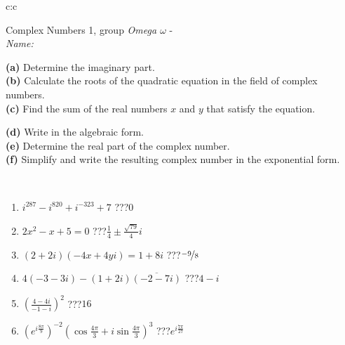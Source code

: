 \documentclass[10pt]{report}
\begin{document}
\begin{tabular}{c:c}
\begin{minipage}[c][104.5mm][t]{0.5\linewidth}
\begin{center}
{\huge Complex Numbers 1, group \textit{Omega $\omega$} -}\\[5mm]
\textit{Name:}\phantom{xxxxxxxxxxxxxxxxxxxxxxxxxxxxxxxxxxxxxxxxxxxxxxxxxxxxxxxxxxxxxxxxx}\\[5mm]
\begin{minipage}{0.95\linewidth}
\begin{center}
{\small \begin{minipage}{0.44\textwidth} \raggedright
\textbf{(a)} Determine the imaginary part. \\[1mm]
\textbf{(b)} Calculate the roots of the quadratic equation in the field of complex numbers. \\[1mm]
\textbf{(c)} Find the sum of the real numbers \(x\) and \(y\) that satisfy the equation. \end{minipage} \begin{minipage}{0.54\textwidth}
\textbf{(d)} Write in the algebraic form. \\[1mm]
\textbf{(e)} Determine the real part of the complex number. \\[1mm]
\textbf{(f)} Simplify and write the resulting complex number in the exponential form.
\end{minipage}
} \vspace{3mm}
\end{center}
\end{minipage}
\\[1mm]
\begin{minipage}{0.79\linewidth}
\begin{center}
\begin{varwidth}{\linewidth}
\setlength{\itemsep}{0pt}
\begin{enumerate}
\large
\item $i^{287}-i^{820}+i^{-323}+7$\quad \dotfill\; ???\;\dotfill \quad $0$
\item $2x^2-x+5=0$\quad \dotfill\; ???\;\dotfill \quad $\frac{1}{4} \pm{}\frac{ \sqrt{79}}{4}i$
\item $(2+2i)(-4x+4yi)=1+8i$\quad \dotfill\; ???\;\dotfill \quad $\nicefrac{-9}{8}$
\item $4(-3-3i)-(1+2i)\overline{(-2-7i)}$\quad \dotfill\; ???\;\dotfill \quad $4-i$
\item $\left(\frac{4-4i}{-1-i}\right)^2$\quad \dotfill\; ???\;\dotfill \quad $16$
\item $\left(e^{i\frac{8\pi}{9}}\right)^{-2}\left(\cos{\frac{4\pi}{3}}+i\sin{\frac{4\pi}{3}}\right)^{3}$\quad \dotfill\; ???\;\dotfill \quad $e^{i\frac{7\pi}{27}}$
\end{enumerate}

\end{varwidth}
\end{center}
\end{minipage}
\end{center}
\end{minipage}
\end{tabular}
\end{document}
